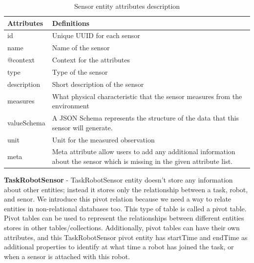 	\begin{table}[!htbp]
		\begin{tabular}{|l|p{12cm}|}
			\hline
			\textbf{Attributes} & \textbf{Definitions} \\ \hline
			id & Unique UUID for each sensor \\ \hline
			name & Name of the sensor \\ \hline
			@context & Context for the attributes \\ \hline
			type & Type of the sensor \\ \hline
			description & Short description of the sensor \\ \hline
			measures & What physical characteristic that the sensor measures from the environment \\ \hline
			valueSchema & A JSON Schema represents the structure of the data that this sensor will generate. \\ \hline
			unit & Unit for the measured observation\\ \hline
			meta & Meta attribute allow users to add any additional information about the sensor which is missing in the given attribute list.\\ \hline
			
		\end{tabular}
		\caption{Sensor entity attributes description}
		\label{tab:sensor_entity}
	\end{table}
	
	\newpage
	\textbf{TaskRobotSensor} - TaskRobotSensor entity doesn't store any information about other entities; instead it stores only the relationship between a task, robot, and senor. We introduce this pivot relation because we need a way to relate entities in non-relational databases too. This type of table is called a pivot table. Pivot tables can be used to represent the relationships between different entities stores in other tables/collections. Additionally, pivot tables can have their own attributes, and this TaskRobotSensor pivot entity has startTime and endTime as additional properties to identify at what time a robot has joined the task, or when a sensor is attached with this robot. 
	
